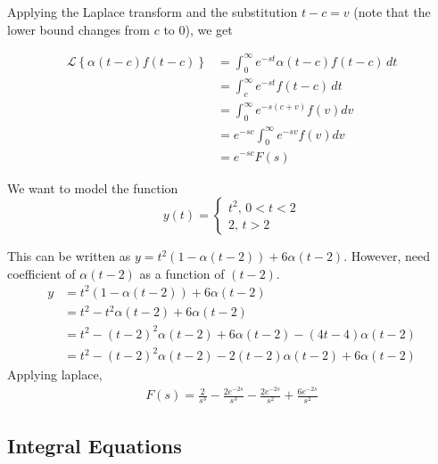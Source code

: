 Applying the Laplace transform and the substitution $t-c=v$ (note that the lower bound changes from $c$ to $0$), we get

\begin{align*}
    \mathcal{L}\left\lbrace \alpha(t-c)f(t-c) \right\rbrace&=\int_0^\infty e^{-st}\alpha(t-c)f(t-c)\,dt\\
    &=\int_c^\infty e^{-st}f(t-c)\,dt\\
    &=\int_0^\infty e^{-s(c+v)}f(v)dv\\
    &=e^{-sc}\int_0^\infty e^{-sv}f(v)dv\\
    &=e^{-sc}F(s)
\end{align*}

\begin{example}
    We want to model the function
    $$y(t)=\begin{cases}
        t^2,\, 0<t<2\\
        2,\,t>2
    \end{cases}$$
    \begin{figure}[H]
        \centering
    \end{figure}
    This can be written as $y=t^2(1-\alpha(t-2))+6\alpha(t-2)$. However, need coefficient of $\alpha(t-2)$ as a function of $(t-2)$.
    \begin{align*}
        y&=t^2(1-\alpha(t-2))+6\alpha(t-2)\\
        &=t^2-t^2\alpha(t-2)+6\alpha(t-2)\\
        &=t^2-(t-2)^2\alpha(t-2)+6\alpha(t-2)-(4t-4)\alpha(t-2)\\
        &=t^2-(t-2)^2\alpha(t-2)-2(t-2)\alpha(t-2)+6\alpha(t-2)
    \end{align*}
    Applying laplace,
    \begin{align*}
        F(s)=\frac{2}{s^3}-\frac{2e^{-2s}}{s^3}-\frac{2e^{-2s}}{s^2}+\frac{6e^{-2s}}{s^2} 
    \end{align*}
\end{example}

\subsection{Integral Equations}

